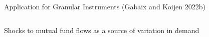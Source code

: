 \documentclass[notes,11pt, aspectratio=169]{beamer}
\newenvironment{wideitemize}{\itemize\addtolength{\itemsep}{10pt}}{\enditemize}
\begin{document}
\begin{frame}{Application for Granular Instruments (Gabaix and Koijen 2022b)}
\begin{columns}[T] %
\begin{column}{.5\textwidth}
  \begin{wideitemize}
  \item Shocks to mutual fund flows as a source of variation in demand
  \end{wideitemize}
\end{column}%
\hfill%
\begin{column}{.5\textwidth}

\end{column}%
\end{columns}
\end{frame}
\end{document}

